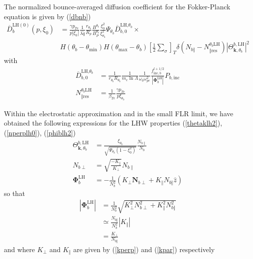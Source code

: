 The normalized bounce-averaged diffusion coefficient for the Fokker-Planck
equation is given by (\ref{dbnb})%
\begin{align}
\overline{D}_{b}^{\text{LH}(0)}(p,\xi_{0})  &  =\frac{\gamma p_{Te}}{p\left|
\xi_{0}\right|  }\frac{1}{\lambda\widetilde{q}}\frac{r_{\theta_{b}}}{R_{p}%
}\frac{B^{\theta_{b}}}{B_{P}^{\theta_{b}}}\frac{\xi_{0}^{2}}{\xi_{\theta_{b}%
}^{2}}\Psi_{\theta_{b}}\overline{D}_{b,0}^{\text{LH,}\theta_{b}}%
\times\nonumber\\
&  H\left(  \theta_{b}-\theta_{\min}\right)  H\left(  \theta_{\max}-\theta
_{b}\right)  \left[  \frac{1}{2}\sum\limits_{\sigma}\right]  _{T}\delta\left(
N_{b\Vert}-N_{\Vert\text{res}}^{\theta_{b}\text{LH}}\right)  \left|
\Theta_{\mathbf{k,}\theta_{b}}^{b,\text{LH}}\right|  ^{2} \label{dlh2}%
\end{align}
with%
\begin{align}
\overline{D}_{b,0}^{\text{LH,}\theta_{b}}  &  =\frac{1}{r_{\theta_{b}%
}R_{\theta_{b}}}\frac{1}{m_{e}\ln\Lambda}\frac{1}{\omega_{b}\omega_{pe}^{2}%
}\frac{f_{\text{inc},b}^{l+1/2}}{\left|  \mathbf{\Phi}_{b}^{\text{LH}}\right|
}P_{b,\text{inc}}\\
N_{\Vert\text{res}}^{\theta_{b}\text{LH}}  &  =\frac{1}{\beta_{Te}}%
\frac{\gamma p_{Te}}{p\xi_{\theta_{b}}}%
\end{align}

Within the electrostatic approximation and in the small FLR limit, we have
obtained the following expressions for the LHW properties (\ref{thetaklh2}),
(\ref{nperplh0}), (\ref{phiblh2})
\begin{align}
\Theta_{\mathbf{k},\theta_{b}}^{b,\text{LH}}  &  =\frac{\xi_{\theta_{b}}%
}{\sqrt{\Psi_{\theta_{b}}\left(  1-\xi_{0}^{2}\right)  }}\frac{N_{b\parallel}%
}{N_{b}}\\
N_{b\perp}  &  =\sqrt{\frac{-K_{\parallel}}{K_{\perp}}}N_{b\parallel}\\
\mathbf{\Phi}_{b}^{\text{LH}}  &  =-\frac{1}{N_{b}^{2}}\left(  K_{\perp
}\mathbf{N}_{b\perp}+K_{\Vert}N_{b\Vert}\widehat{z}\right)
\end{align}
so that%
\begin{align}
\left|  \mathbf{\Phi}_{b}^{\text{LH}}\right|   &  =\frac{1}{N_{b}^{2}}%
\sqrt{K_{\perp}^{2}N_{b\perp}^{2}+K_{\Vert}^{2}N_{b\Vert}^{2}}\\
&  \simeq\frac{N_{b\Vert}}{N_{b}^{2}}\left|  K_{\Vert}\right| \\
&  =\frac{K_{\perp}}{N_{b\Vert}}%
\end{align}
and where $K_{\perp}$ and $K_{\Vert}$ are given by (\ref{kperp}) and
(\ref{kpar}) respectively

